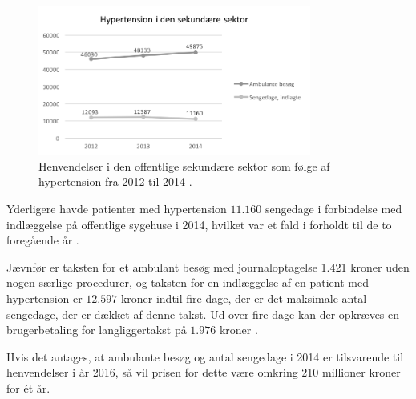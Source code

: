 \begin{figure}[H]
\centering
\includegraphics[width=0.8\textwidth]{figures/hyp_sekundaer}
\caption{Henvendelser i den offentlige sekundære sektor som følge af hypertension fra 2012 til 2014 \citep{sundhedsdatastyrelsen2016}.}
\label{fig:hyp_sekundaer}
\end{figure}

\noindent
Yderligere havde patienter med hypertension $11.160$ sengedage i forbindelse med indlæggelse på offentlige sygehuse i 2014, hvilket var et fald i forholdt til de to foregående år \citep{sundhedsdatastyrelsen2016}. 

Jævnfør \citeauthor{takstvejledning2016} er taksten for et ambulant besøg  med journaloptagelse 1.421 kroner uden nogen særlige procedurer, og taksten for en indlæggelse af en patient med hypertension er $12.597$ kroner indtil fire dage, der er det maksimale antal sengedage, der er dækket af denne takst. Ud over fire dage kan der opkræves en brugerbetaling for langliggertakst på $1.976$ kroner \citep{takstvejledning2016}. 

Hvis det antages, at ambulante besøg og antal sengedage i 2014 er tilsvarende til henvendelser i år 2016, så vil prisen for dette være omkring 210 millioner kroner for ét år. 